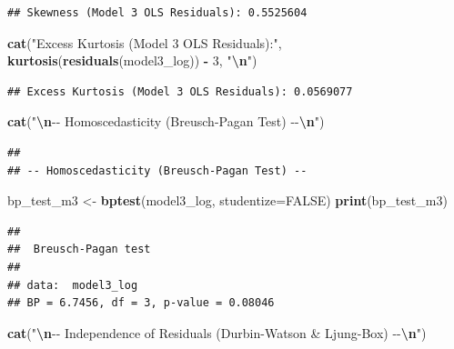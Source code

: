 \documentclass[
]{article}
\newenvironment{Shaded}{\begin{snugshade}}{\end{snugshade}}
\newcommand{\AttributeTok}[1]{\textcolor[rgb]{0.13,0.29,0.53}{#1}}
\newcommand{\ConstantTok}[1]{\textcolor[rgb]{0.56,0.35,0.01}{#1}}
\newcommand{\DecValTok}[1]{\textcolor[rgb]{0.00,0.00,0.81}{#1}}
\newcommand{\FunctionTok}[1]{\textcolor[rgb]{0.13,0.29,0.53}{\textbf{#1}}}
\newcommand{\NormalTok}[1]{#1}
\newcommand{\OtherTok}[1]{\textcolor[rgb]{0.56,0.35,0.01}{#1}}
\newcommand{\SpecialCharTok}[1]{\textcolor[rgb]{0.81,0.36,0.00}{\textbf{#1}}}
\newcommand{\StringTok}[1]{\textcolor[rgb]{0.31,0.60,0.02}{#1}}
\begin{document}
\begin{verbatim}
## Skewness (Model 3 OLS Residuals): 0.5525604
\end{verbatim}

\begin{Shaded}
\begin{Highlighting}[]
  \FunctionTok{cat}\NormalTok{(}\StringTok{"Excess Kurtosis (Model 3 OLS Residuals):"}\NormalTok{, }\FunctionTok{kurtosis}\NormalTok{(}\FunctionTok{residuals}\NormalTok{(model3\_log)) }\SpecialCharTok{{-}} \DecValTok{3}\NormalTok{, }\StringTok{"}\SpecialCharTok{\textbackslash{}n}\StringTok{"}\NormalTok{)}
\end{Highlighting}
\end{Shaded}

\begin{verbatim}
## Excess Kurtosis (Model 3 OLS Residuals): 0.0569077
\end{verbatim}

\begin{Shaded}
\begin{Highlighting}[]
  \FunctionTok{cat}\NormalTok{(}\StringTok{"}\SpecialCharTok{\textbackslash{}n}\StringTok{{-}{-} Homoscedasticity (Breusch{-}Pagan Test) {-}{-}}\SpecialCharTok{\textbackslash{}n}\StringTok{"}\NormalTok{)}
\end{Highlighting}
\end{Shaded}

\begin{verbatim}
## 
## -- Homoscedasticity (Breusch-Pagan Test) --
\end{verbatim}

\begin{Shaded}
\begin{Highlighting}[]
\NormalTok{  bp\_test\_m3 }\OtherTok{\textless{}{-}} \FunctionTok{bptest}\NormalTok{(model3\_log, }\AttributeTok{studentize=}\ConstantTok{FALSE}\NormalTok{)}
  \FunctionTok{print}\NormalTok{(bp\_test\_m3)}
\end{Highlighting}
\end{Shaded}

\begin{verbatim}
## 
##  Breusch-Pagan test
## 
## data:  model3_log
## BP = 6.7456, df = 3, p-value = 0.08046
\end{verbatim}

\begin{Shaded}
\begin{Highlighting}[]
  \FunctionTok{cat}\NormalTok{(}\StringTok{"}\SpecialCharTok{\textbackslash{}n}\StringTok{{-}{-} Independence of Residuals (Durbin{-}Watson \& Ljung{-}Box) {-}{-}}\SpecialCharTok{\textbackslash{}n}\StringTok{"}\NormalTok{)}
\end{Highlighting}
\end{Shaded}
\end{document}
